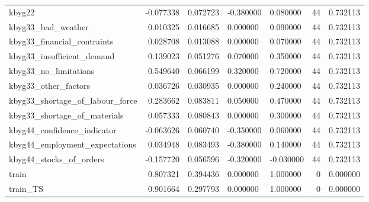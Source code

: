 \begin{landscape}
\begin{longtable}[h!]{lrrllrr}
kbyg22 & -0.077338 & 0.072723 & -0.380000 & 0.080000 & 44 & 0.732113 \\
kbyg33_bad_weather & 0.010325 & 0.016685 & 0.000000 & 0.090000 & 44 & 0.732113 \\
kbyg33_financial_contraints & 0.028708 & 0.013088 & 0.000000 & 0.070000 & 44 & 0.732113 \\
kbyg33_insufficient_demand & 0.139023 & 0.051276 & 0.070000 & 0.350000 & 44 & 0.732113 \\
kbyg33_no_limitations & 0.549640 & 0.066199 & 0.320000 & 0.720000 & 44 & 0.732113 \\
kbyg33_other_factors & 0.036726 & 0.030935 & 0.000000 & 0.240000 & 44 & 0.732113 \\
kbyg33_shortage_of_labour_force & 0.283662 & 0.083811 & 0.050000 & 0.470000 & 44 & 0.732113 \\
kbyg33_shortage_of_materials & 0.057333 & 0.080843 & 0.000000 & 0.300000 & 44 & 0.732113 \\
kbyg44_confidence_indicator & -0.063626 & 0.060740 & -0.350000 & 0.060000 & 44 & 0.732113 \\
kbyg44_employment_expectations & 0.034948 & 0.083493 & -0.380000 & 0.140000 & 44 & 0.732113 \\
kbyg44_stocks_of_orders & -0.157720 & 0.056596 & -0.320000 & -0.030000 & 44 & 0.732113 \\
train & 0.807321 & 0.394436 & 0.000000 & 1.000000 & 0 & 0.000000 \\
train_TS & 0.901664 & 0.297793 & 0.000000 & 1.000000 & 0 & 0.000000 \\
\end{longtable}\end{landscape}
